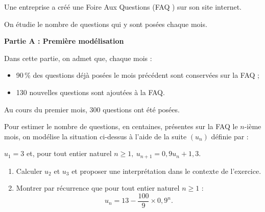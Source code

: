 \medskip

Une entreprise a créé une Foire Aux Questions (\og FAQ \fg) sur son site internet.

\medskip

On étudie le nombre de questions qui y sont posées chaque mois.

\bigskip

\textbf{Partie A : Première modélisation}

\medskip

Dans cette partie, on admet que, chaque mois :

\begin{itemize}
\item[$\bullet~~$]90\,\% des questions déjà posées le mois précédent sont conservées sur la FAQ ;
\item[$\bullet~~$]130 nouvelles questions sont ajoutées à la FAQ.
\end{itemize}

Au cours du premier mois, $300$ questions ont été posées.

\medskip

Pour estimer le nombre de questions, en centaines, présentes sur la FAQ le $n$-ième
mois, on modélise la situation ci-dessus à l'aide de la suite $\left(u_n\right)$ définie par : \begin{center}$u_1 =3$ \quad et, pour tout entier naturel $n \geqslant 1,\:u_{n+1} = 0,9u_n + 1,3$.\end{center}

\smallskip

\begin{enumerate}
\item Calculer $u_2$ et $u_3$ et proposer une interprétation dans le contexte de l'exercice. \item Montrer par récurrence que pour tout entier naturel $n \geqslant 1$ :
\[u_n = 13 - \dfrac{100}{9} \times 0,9^n.\]
\end{enumerate}

